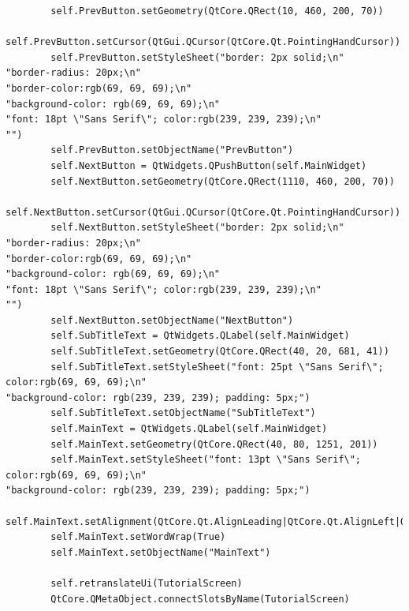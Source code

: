 \documentclass{article}
\begin{document}
\begin{lstlisting}
        self.PrevButton.setGeometry(QtCore.QRect(10, 460, 200, 70))
        self.PrevButton.setCursor(QtGui.QCursor(QtCore.Qt.PointingHandCursor))
        self.PrevButton.setStyleSheet("border: 2px solid;\n"
"border-radius: 20px;\n"
"border-color:rgb(69, 69, 69);\n"
"background-color: rgb(69, 69, 69);\n"
"font: 18pt \"Sans Serif\"; color:rgb(239, 239, 239);\n"
"")
        self.PrevButton.setObjectName("PrevButton")
        self.NextButton = QtWidgets.QPushButton(self.MainWidget)
        self.NextButton.setGeometry(QtCore.QRect(1110, 460, 200, 70))
        self.NextButton.setCursor(QtGui.QCursor(QtCore.Qt.PointingHandCursor))
        self.NextButton.setStyleSheet("border: 2px solid;\n"
"border-radius: 20px;\n"
"border-color:rgb(69, 69, 69);\n"
"background-color: rgb(69, 69, 69);\n"
"font: 18pt \"Sans Serif\"; color:rgb(239, 239, 239);\n"
"")
        self.NextButton.setObjectName("NextButton")
        self.SubTitleText = QtWidgets.QLabel(self.MainWidget)
        self.SubTitleText.setGeometry(QtCore.QRect(40, 20, 681, 41))
        self.SubTitleText.setStyleSheet("font: 25pt \"Sans Serif\"; color:rgb(69, 69, 69);\n"
"background-color: rgb(239, 239, 239); padding: 5px;")
        self.SubTitleText.setObjectName("SubTitleText")
        self.MainText = QtWidgets.QLabel(self.MainWidget)
        self.MainText.setGeometry(QtCore.QRect(40, 80, 1251, 201))
        self.MainText.setStyleSheet("font: 13pt \"Sans Serif\"; color:rgb(69, 69, 69);\n"
"background-color: rgb(239, 239, 239); padding: 5px;")
        self.MainText.setAlignment(QtCore.Qt.AlignLeading|QtCore.Qt.AlignLeft|QtCore.Qt.AlignTop)
        self.MainText.setWordWrap(True)
        self.MainText.setObjectName("MainText")

        self.retranslateUi(TutorialScreen)
        QtCore.QMetaObject.connectSlotsByName(TutorialScreen)


\end{lstlisting}
\end{document}
